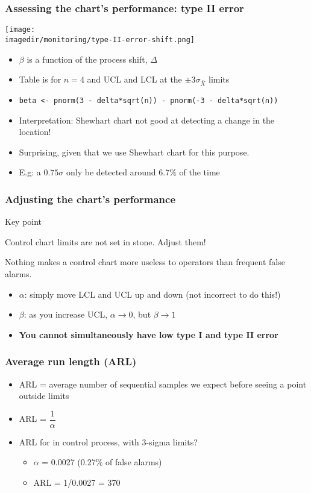 \begin{frame}\frametitle{Assessing the chart's performance: type II error}
	
	\texttt{[image: \\imagedir/monitoring/type-II-error-shift.png]}
	\begin{itemize}
		\item	$\beta$ is a function of the process shift, $\Delta$ 
		\item	Table is for $n=4$ and UCL and LCL at the $\pm 3 \sigma_{\bar{X}}$ limits 
		\item	\texttt{beta <- pnorm(3 - delta*sqrt(n)) - pnorm(-3 - delta*sqrt(n))} 
		\item	Interpretation: Shewhart chart not good at detecting a change in the location! 
		\item	Surprising, given that we use Shewhart chart for this purpose. 
		\item	E.g: a $0.75\sigma$ only be detected around 6.7\% of the time 
	\end{itemize}
\end{frame}

\begin{frame}\frametitle{Adjusting the chart's performance}
	\begin{block}
		{Key point} 
		\begin{center}
			Control chart limits are not set in stone. Adjust them! 
		\end{center}
	\end{block}
	Nothing makes a control chart more useless to operators than frequent false alarms.
	\begin{itemize}
		\item	$\alpha$: simply move LCL and UCL up and down (not incorrect to do this!) 
		\item	$\beta$: as you increase UCL, $\alpha \rightarrow 0$, but $\beta \rightarrow 1$ 
		\item	\textbf{You cannot simultaneously have low type I and type II error} 
	\end{itemize}
\end{frame}

\begin{frame}\frametitle{Average run length (ARL)}
	\begin{itemize}
		\item	ARL = average number of sequential samples we expect before seeing a point outside limits 
		\item	ARL = $\dfrac{1}{\alpha}$ 
		\item	ARL for in control process, with 3-sigma limits? 
		\begin{itemize}
			\item	$\alpha$ = 0.0027 (0.27\% of false alarms) 
			\item	ARL = 1/0.0027 = 370 
		\end{itemize}
	\end{itemize}
\end{frame}


